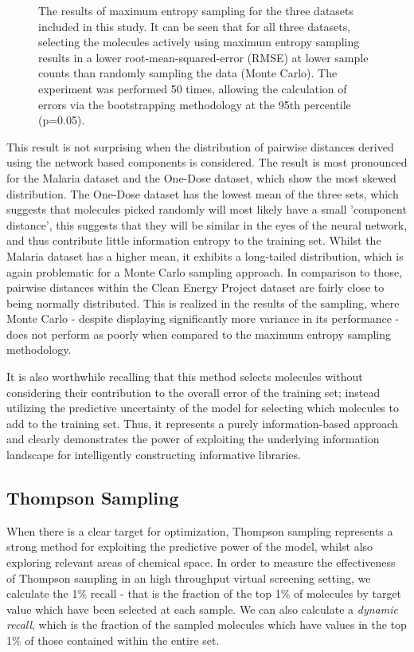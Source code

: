 \documentclass{pnastwo}
\begin{document}
\begin{article}
\begin{figure}[ht]
\caption{The results of maximum entropy sampling for the three datasets included in this study.  It can be seen that for all three datasets, selecting the molecules actively using maximum entropy sampling results in a lower root-mean-squared-error (RMSE) at lower sample counts than randomly sampling the data (Monte Carlo). The experiment was performed 50 times, allowing the calculation of errors via the bootstrapping methodology at the 95th percentile (p=0.05).}
\label{fig:max_entropy}
\end{figure}  

This result is not surprising when the distribution of pairwise distances derived using the network based components is considered. The result is most pronounced for the Malaria dataset and the One-Dose dataset, which show the most skewed distribution.  The One-Dose dataset has the lowest mean of the three sets, which suggests that molecules picked randomly will most likely have a small 'component distance', this suggests that they will be similar in the eyes of the neural network, and thus contribute little information entropy to the training set. Whilst the Malaria dataset has a higher mean, it exhibits a long-tailed distribution, which is again problematic for a Monte Carlo sampling approach.  In comparison to those, pairwise distances within the Clean Energy Project dataset are fairly close to being normally distributed.  This is realized in the results of the sampling, where Monte Carlo - despite displaying significantly more variance in its performance - does not perform as poorly when compared to the maximum entropy sampling methodology.

It is also worthwhile recalling that this method selects molecules without considering their contribution to the overall error of the training set; instead utilizing the predictive uncertainty of the model for selecting which molecules to add to the training set. Thus, it represents a purely information-based approach and clearly demonstrates the power of exploiting the underlying information landscape for intelligently constructing informative libraries. 

\subsection{Thompson Sampling}

When there is a clear target for optimization, Thompson sampling represents a strong method for exploiting the predictive power of the model, whilst also exploring relevant areas of chemical space. In order to measure the effectiveness of Thompson sampling in an high throughput virtual screening setting, we calculate the 1\% recall - that is the fraction of the top 1\% of molecules by target value which have been selected at each sample.  We can also calculate a \textit{dynamic recall}, which is the fraction of the sampled molecules which have values in the top 1\% of those contained within the entire set. 


\end{article}
\end{document}
